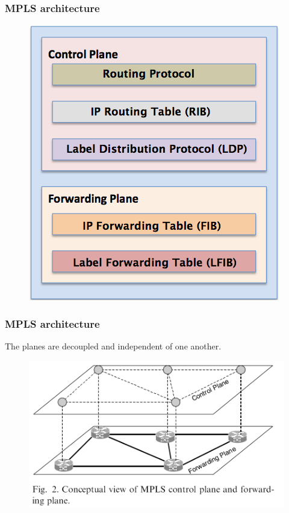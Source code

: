 \documentclass[12pt]{beamer}
\begin{document}
\begin{frame}
	\frametitle{MPLS architecture}
		\begin{figure}[h]
			\begin{center}
				\includegraphics[scale=0.40]{mpls-arch.png}
			\end{center}
		\end{figure}	
\end{frame}


\begin{frame}
	\frametitle{MPLS architecture}
	The planes are decoupled and independent of one another. 
		\begin{figure}[h]
			\begin{center}
				\includegraphics[scale=0.40]{separation.png}
			\end{center}
		\end{figure}
\end{frame}
\end{document}
